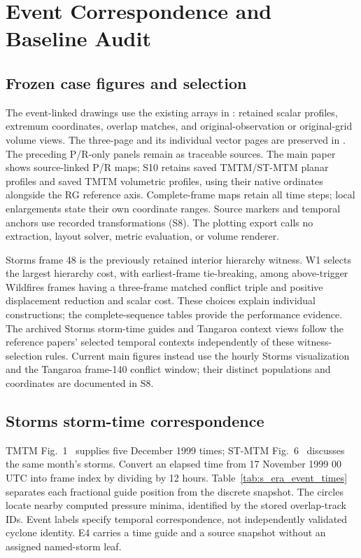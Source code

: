 \section{Event Correspondence and Baseline Audit}\label{sec:event_audit}
\subsection{Frozen case figures and selection}
The event-linked drawings use the existing arrays in : retained scalar profiles, extremum coordinates, overlap matches, and original-observation or original-grid volume views. The three-page  and its individual vector pages are preserved in . The preceding P/R-only panels remain as traceable sources. The main paper shows source-linked P/R maps; S10 retains saved TMTM/ST-MTM planar profiles and saved TMTM volumetric profiles, using their native ordinates alongside the RG reference axis. Complete-frame maps retain all time steps; local enlargements state their own coordinate ranges. Source markers and temporal anchors use recorded transformations (S8). The plotting export calls no extraction, layout solver, metric evaluation, or volume renderer.

Storms frame 48 is the previously retained interior hierarchy witness. W1 selects the largest hierarchy cost, with earliest-frame tie-breaking, among above-trigger Wildfires frames having a three-frame matched conflict triple and positive displacement reduction and scalar cost. These choices explain individual constructions; the complete-sequence tables provide the performance evidence. The archived Storms storm-time guides and Tangaroa context views follow the reference papers' selected temporal contexts independently of these witness-selection rules. Current main figures instead use the hourly Storms visualization and the Tangaroa frame-140 conflict window; their distinct populations and coordinates are documented in S8.

\subsection{Storms storm-time correspondence}
TMTM Fig.~1~\cite{Koepp:2023:TMTM} supplies five December 1999 times; ST-MTM Fig.~6~\cite{STMTM:2026} discusses the same month's storms. Convert an elapsed time from 17 November 1999 00 UTC into frame index by dividing by 12 hours. Table~\ref{tab:s_era_event_times} separates each fractional guide position from the discrete snapshot. The circles locate nearby computed pressure minima, identified by the stored overlap-track IDs. Event labels specify temporal correspondence, not independently validated cyclone identity. E4 carries a time guide and a source snapshot without an assigned named-storm leaf.

